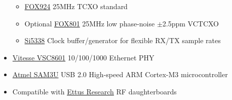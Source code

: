 \begin{itemize}
\begin{itemize}
                \item \href{http://www.foxonline.com/pdfs/fox924.pdf}{FOX924} 25MHz TCXO standard
                \item Optional \href{http://www.foxonline.com/pdfs/FOX801BHCLF.pdf}{FOX801} 25MHz low phase-noise $\pm$2.5ppm VCTCXO
                \item \href{http://www.silabs.com/products/clocksoscillators/anyrategeneratorsandbuffers/Pages/default.aspx}{Si5338} Clock buffer/generator for flexible RX/TX sample rates
            \end{itemize}
        \item \href{http://www.vitesse.com/products/product.php?number=VSC8601}{Vitesse VSC8601} 10/100/1000 Ethernet PHY
        \item \href{http://www.atmel.com/products/AT91/sam3landing.asp}{Atmel SAM3U} USB 2.0 High-speed ARM Cortex-M3 microcontroller
        \item Compatible with \href{http://www.ettus.com}{Ettus Research} RF daughterboards
    \end{itemize}
    
